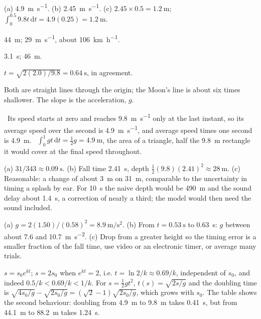 \documentclass[11pt,twoside,openany]{book}
\newcommand{\dd}{\mathrm{d}}
\newcommand{\viewtag}[3]{\fcolorbox{#2}{#3}{\footnotesize\textbf{\textcolor{#2}{#1}}}}
\newcommand{\elemtag}{\viewtag{Elementary}{elemcol}{elempale}}
\newcommand{\calctag}{\viewtag{Calculus}{calccol}{calcpale}}
\begin{document}
\begin{description}[leftmargin=2.6em,itemsep=3pt,style=sameline]
  \item[2.31] (a) \SI{4.9}{\metre\per\second}. (b) \SI{2.45}{\metre\per\second}. (c) $2.45 \times 0.5 = \SI{1.2}{\metre}$; $\int_0^{0.5} 9.8t\,\dd t = 4.9(0.25) = \SI{1.2}{\metre}$.
  \item[2.32] \SI{44}{\metre}; \SI{29}{\metre\per\second}, about \SI{106}{\kilo\metre\per\hour}.
  \item[2.33] \SI{3.1}{\second}; \SI{46}{\metre}.
  \item[2.34] $t = \sqrt{2(2.0)/9.8} = \SI{0.64}{\second}$, in agreement.
  \item[2.35] Both are straight lines through the origin; the Moon's line is about six times shallower. The slope is the acceleration, $g$.
  \item[2.36] \elemtag\ Its speed starts at zero and reaches \SI{9.8}{\metre\per\second} only at the last instant, so its average speed over the second is \SI{4.9}{\metre\per\second}, and average speed times one second is \SI{4.9}{\metre}. \calctag\ $\int_0^1 gt\,\dd t = \tfrac12 g = \SI{4.9}{\metre}$, the area of a triangle, half the \SI{9.8}{\metre} rectangle it would cover at the final speed throughout.
  \item[2.37] (a) $31/343 \approx \SI{0.09}{\second}$. (b) Fall time \SI{2.41}{\second}, depth $\tfrac12 (9.8)(2.41)^2 \approx \SI{28}{\metre}$. (c) Reasonable: a change of about \SI{3}{\metre} on \SI{31}{\metre}, comparable to the uncertainty in timing a splash by ear. For \SI{10}{\second} the naive depth would be \SI{490}{\metre} and the sound delay about \SI{1.4}{\second}, a correction of nearly a third; the model would then need the sound included.
  \item[2.38] (a) $g = 2(1.50)/(0.58)^2 = \SI{8.9}{\metre\per\second\squared}$. (b) From $t = \SI{0.53}{\second}$ to \SI{0.63}{\second}: $g$ between about \SI{7.6}{} and \SI{10.7}{\metre\per\second\squared}. (c) Drop from a greater height so the timing error is a smaller fraction of the fall time, use video or an electronic timer, or average many trials.
  \item[2.39] $s = s_0 e^{kt}$; $s = 2s_0$ when $e^{kt} = 2$, i.e. $t = \ln 2/k \approx 0.69/k$, independent of $s_0$, and indeed $0.5/k < 0.69/k < 1/k$. For $s = \tfrac12 g t^2$, $t(s) = \sqrt{2s/g}$ and the doubling time is $\sqrt{4s_0/g} - \sqrt{2s_0/g} = (\sqrt2 - 1)\sqrt{2s_0/g}$, which grows with $s_0$. The table shows the second behaviour: doubling from \SI{4.9}{\metre} to \SI{9.8}{\metre} takes \SI{0.41}{\second}, but from \SI{44.1}{\metre} to \SI{88.2}{\metre} takes \SI{1.24}{\second}.

\end{description}
\end{document}
